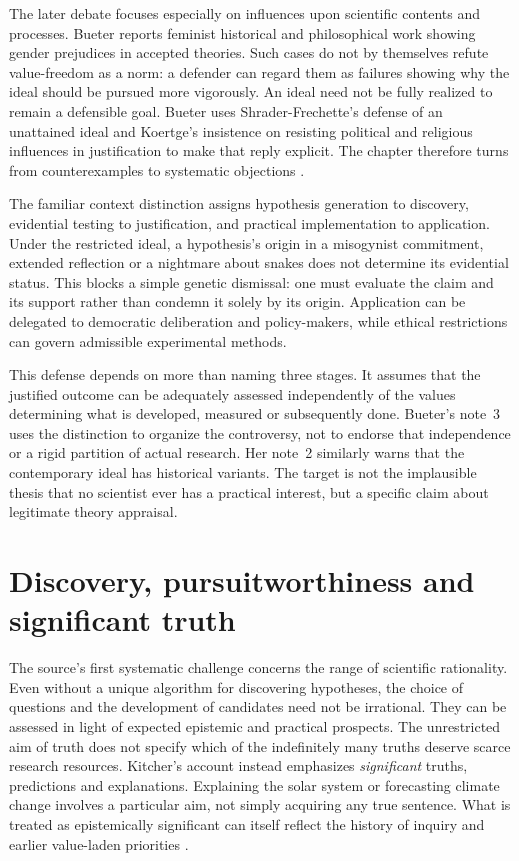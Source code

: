 The later debate focuses especially on influences upon scientific contents
and processes. Bueter reports feminist historical and philosophical work
showing gender prejudices in accepted theories. Such cases do not by
themselves refute value-freedom as a norm: a defender can regard them as
failures showing why the ideal should be pursued more vigorously.
An ideal need not be fully realized to remain a defensible goal. Bueter
uses Shrader-Frechette's defense of an unattained ideal and Koertge's
insistence on resisting political and religious influences in justification
to make that reply explicit. The chapter therefore turns from
counterexamples to systematic objections
\cite[sec.~1.2, pp.~758--759]{Bueter2021ValueFreedom}.

The familiar context distinction assigns hypothesis generation to discovery,
evidential testing to justification, and practical implementation to
application. Under the restricted ideal, a hypothesis's origin in a
misogynist commitment, extended reflection or a nightmare about snakes
does not determine its evidential
status. This blocks a simple genetic dismissal: one must evaluate the
claim and its support rather than condemn it solely by its origin.
Application can be delegated to democratic deliberation and policy-makers,
while ethical restrictions can govern admissible experimental methods.

This defense depends on more than naming three stages. It assumes that
the justified outcome can be adequately assessed independently of the
values determining what is developed, measured or subsequently done.
Bueter's note~3 uses the distinction to organize the controversy, not to
endorse that independence or a rigid partition of actual research. Her
note~2 similarly warns that the contemporary ideal has historical variants.
The target is not the implausible thesis that no scientist ever has a
practical interest, but a specific claim about legitimate theory appraisal.

\section{Discovery, pursuitworthiness and significant truth}
\label{sec:p11-rat142-pursuit}

The source's first systematic challenge concerns the range of scientific
rationality. Even without a unique algorithm for discovering hypotheses,
the choice of questions and the development of candidates need not be
irrational. They can be assessed in light of expected epistemic and
practical prospects. The unrestricted aim of truth does not specify which
of the indefinitely many truths deserve scarce research resources.
Kitcher's account instead emphasizes \emph{significant} truths,
predictions and explanations. Explaining the solar system or forecasting
climate change involves a particular aim, not simply acquiring any true
sentence. What is treated as epistemically significant can itself reflect
the history of inquiry and earlier value-laden priorities
\cite[sec.~2, p.~759]{Bueter2021ValueFreedom}.

